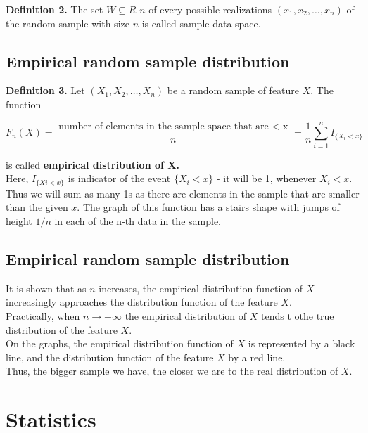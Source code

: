 \documentclass[a4paper, 12pt]{article}
\begin{document}
\textbf{Definition 2.} The set $W \subseteq R$ $n$ of every possible realizations $(x_1, x_2, \dots , x_n)$ of the random sample with size $n$ is called sample data space.\\


\subsection{Empirical random sample distribution}

\textbf{Definition 3.} Let $(X_1, X_2, \dots ,X_n)$ be a random sample of feature $X$. The function

\[ F_n(X) = \frac{\text{number of elements in the sample space that are $<$ x}}{n} = \frac{1}{n}\sum_{i=1}^{n}I_{\{ X_i<x \}} \]

is called \textbf{empirical distribution of X.}\\

Here, $I_{\{Xi<x\}}$ is indicator of the event $\{X_i < x\}$ - it will be 1, whenever $X_i < x$. Thus we will sum as many 1s as there are elements in the sample that are smaller than the given $x$. The graph of this function has a stairs shape with jumps of height $1/n$ in each of the n-th data in the sample.





\subsection{Empirical random sample distribution}

It is shown that as $n$ increases, the empirical distribution function of $X$ increasingly approaches the distribution function of the feature $X$.\\ 

Practically, when $n\rightarrow +\infty$ the empirical distribution of $X$ tends t othe true distribution of the feature $X$.\\


On the graphs, the empirical distribution function of $X$ is represented by a black line, and the distribution function of the feature $X$ by a red line.\\

Thus, the bigger sample we have, the closer we are to the real distribution of $X$.


\section{Statistics}
\end{document}
